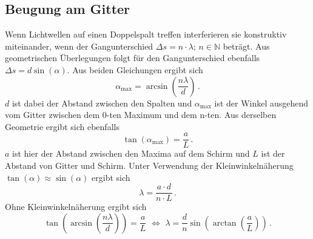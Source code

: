 \subsection{Beugung am Gitter}
Wenn Lichtwellen auf einen Doppelspalt treffen interferieren sie konstruktiv miteinander, wenn der Gangunterschied $\Delta s = n \cdot\lambda ; \, n \in \mathbb{N}$ beträgt. Aus geometrischen Überlegungen folgt für den Gangunterschied ebenfalls $\Delta s = d \sin(\alpha)$. Aus beiden Gleichungen ergibt sich 
\begin{equation*}
    \alpha_{\text{max}} = \arcsin{\left(\frac{n \lambda}{d}\right)} \, .
\end{equation*}
$d$ ist dabei der Abstand zwischen den Spalten und $\alpha_{\text{max}}$ ist der Winkel ausgehend vom Gitter zwischen dem 0-ten Maximum und dem n-ten. 
Aus derselben Geometrie ergibt sich ebenfalls 
\begin{equation*}
    \tan\left( \alpha_{\text{max}} \right) = \frac{a}{L} \, .
\end{equation*}
$a$ ist hier der Abstand zwischen den Maxima auf dem Schirm und $L$ ist der Abstand von Gitter und Schirm. 
Unter Verwendung der Kleinwinkelnäherung $\tan(\alpha) \approx \sin(\alpha)$ ergibt sich 
\begin{equation}
    \lambda = \frac{a \cdot d}{n \cdot L} \, . \label{eqn:Wellenlaenge_max}
\end{equation}
Ohne Kleinwinkelnäherung ergibt sich  
\begin{equation}
    \tan{\left(\arcsin{\left(\frac{n \lambda}{d}\right)}\right)} = \frac{a}{L} \,\, \Leftrightarrow \,\,  \lambda = \frac{d}{n} \sin{\left(\arctan{\left(\frac{a}{L}\right)}\right)} \label{eqn:Wellenlaenge_genau} \, .
\end{equation}

